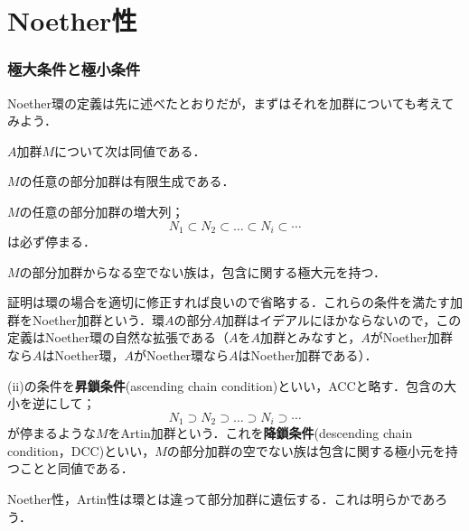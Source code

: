 \newpage
\part[Noetherian properties]{Noether性}
\section{極大条件と極小条件}
Noether環の定義は先に述べたとおりだが，まずはそれを加群についても考えてみよう．
\begin{prop}
	$A$加群$M$について次は同値である．
	\begin{sakura}
		\item $M$の任意の部分加群は有限生成である．
		\item $M$の任意の部分加群の増大列；
		\[N_1\subset N_2\subset\dots\subset N_i\subset\cdots\]
		は必ず停まる．
		\item $M$の部分加群からなる空でない族は，包含に関する極大元を持つ．
	\end{sakura}
\end{prop} 

証明は環の場合を適切に修正すれば良いので省略する．これらの条件を満たす加群をNoether加群という．環$A$の部分$A$加群はイデアルにほかならないので，この定義はNoether環の自然な拡張である（$A$を$A$加群とみなすと，$A$がNoether加群なら$A$はNoether環，$A$がNoether環なら$A$はNoether加群である）．

(ii)の条件を\textbf{昇鎖条件}(ascending chain condition)といい，ACCと略す．包含の大小を逆にして；
\[N_1\supset N_2\supset\dots\supset N_i\supset\cdots\]
が停まるような$M$をArtin加群という．これを\textbf{降鎖条件}(descending chain condition，DCC)といい，$M$の部分加群の空でない族は包含に関する極小元を持つことと同値である．

Noether性，Artin性は環とは違って部分加群に遺伝する．これは明らかであろう．


